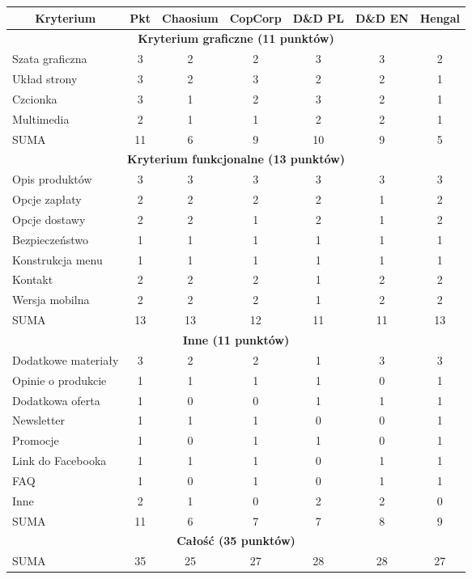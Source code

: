 \documentclass[a4paper,11pt]{article}
\begin{document}
\begin{tabular}{|l|c||c|c|c|c|c|}
	\hline
	
	\multicolumn{1}{|c}{\textbf{Kryterium}} & \multicolumn{1}{|c||}{\textbf{Pkt}} & \multicolumn{1}{c}{\textbf{Chaosium}} & \multicolumn{1}{|c}{\textbf{CopCorp}} & \multicolumn{1}{|c}{\textbf{D\&D PL}} &\multicolumn{1}{|c}{\textbf{D\&D EN}} &\multicolumn{1}{|c|}{\textbf{Hengal}}\\
	\hline \hline
	
	\multicolumn{7}{|c|}{\textbf{Kryterium graficzne (11 punktów)}} \\
	\hline
	Szata graficzna & 3 & 2 & 2 & 3 & 3 & 2 \\
	\hline
	Układ strony & 3 & 2 & 3 & 2 & 2 & 1 \\ 
	\hline
	Czcionka & 3 & 1 & 2 & 3 & 2 & 1 \\ 
	\hline
	Multimedia & 2 & 1 & 1 & 2 & 2 & 1 \\ 
	\hline \hline
	SUMA & 11 & 6 & 9 & 10 & 9 & 5 \\ 
	\hline \hline

	\multicolumn{7}{|c|}{\textbf{Kryterium funkcjonalne (13 punktów)}} \\
	\hline
	Opis produktów & 3 & 3 & 3 & 3 & 3 & 3 \\ 
	\hline
	Opcje zapłaty & 2 & 2 & 2 & 2 & 1 & 2 \\ 
	\hline
	Opcje dostawy & 2 & 2 & 1 & 2 & 1 & 2 \\ 
	\hline
	Bezpieczeństwo & 1 & 1 & 1 & 1 & 1 & 1 \\ 
	\hline
	Konstrukcja menu & 1 & 1 & 1 & 1 & 1 & 1 \\ 
	\hline
	Kontakt & 2 & 2 & 2 & 1 & 2 & 2 \\ 
	\hline
	Wersja mobilna & 2 & 2 & 2 & 1 & 2 & 2 \\ 
	\hline \hline
	SUMA & 13 & 13 & 12 & 11 & 11 & 13 \\ 
	\hline \hline
	
	\multicolumn{7}{|c|}{\textbf{Inne (11 punktów)}} \\
	\hline
	Dodatkowe materiały & 3 & 2 & 2 & 1 & 3 & 3 \\ 
	\hline
	Opinie o produkcie & 1 & 1 & 1 & 1 & 0 & 1 \\ 
	\hline
	Dodatkowa oferta & 1 & 0 & 0 & 1 & 1 & 1 \\ 
	\hline
	Newsletter & 1 & 1 & 1 & 0 & 0 & 1 \\ 
	\hline
	Promocje & 1 & 0 & 1 & 1 & 0 & 1 \\ 
	\hline
	Link do Facebooka & 1 & 1 & 1 & 0 & 1 & 1 \\ 
	\hline
	FAQ & 1 & 0 & 1 & 0 & 1 & 1 \\ 
	\hline
	Inne & 2 & 1 & 0 & 2 & 2 & 0 \\ 
	\hline \hline
	SUMA & 11 & 6 & 7 & 7 & 8 & 9 \\ 
	\hline \hline
	
	\multicolumn{7}{|c|}{\textbf{Całość (35 punktów)}} \\
	\hline
	SUMA & 35 & 25 & 27 & 28 & 28 & 27 \\ 
	\hline
	
\end{tabular}
\end{document}
